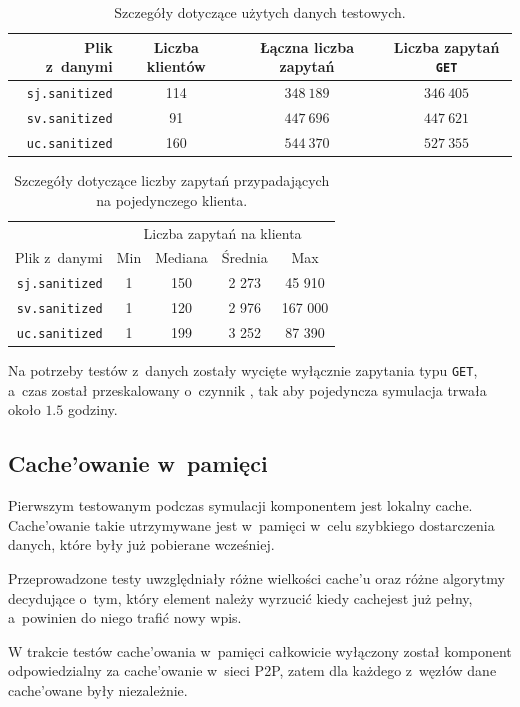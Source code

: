 \documentclass[a4paper,11pt]{scrartcl}
\newcommand{\f}{\texttt}
\newcommand{\s}{ }
\newcommand{\kesz}{cache}
\newcommand{\keszu}{cache'u}
\newcommand{\keszowania}{cache'owania}
\newcommand{\keszowane}{cache'owane}
\newcommand{\keszowanie}{cache'owanie}
\newcommand{\Keszowanie}{Cache'owanie}
\begin{document}
\begin{table}[h!]
\centering
\begin{tabular}{r c c c}
Plik z~danymi & Liczba klientów & Łączna liczba zapytań & Liczba zapytań \f{GET}\\
\hline
\f{sj.sanitized} & 114 & $348~189$ & $346~405$\\
\f{sv.sanitized} & 91 & $447~696$ & $447~621$\\
\f{uc.sanitized} & 160 & $544~370$ & $527~355$\\
\end{tabular}
\caption{Szczegóły dotyczące użytych danych testowych.}
\label{tab_testdata}
\end{table}

\begin{table}[h!]
\centering
\begin{tabular}{r c c c c}
 & \multicolumn{4}{c}{Liczba zapytań na klienta} \\
Plik z~danymi & Min & Mediana & Średnia & Max \\
\hline
\f{sj.sanitized} & 1 & 150 & 2 273 & 45 910  \\
\f{sv.sanitized} & 1 & 120 & 2 976 & 167 000 \\
\f{uc.sanitized} & 1 & 199 & 3 252 & 87 390  \\
\end{tabular}
\caption{Szczegóły dotyczące liczby zapytań przypadających na pojedynczego klienta.}
\label{tab_testdata2}
\end{table}

Na potrzeby testów z~danych zostały wycięte wyłącznie zapytania typu \f{GET}, a~czas został przeskalowany o~czynnik , tak aby pojedyncza symulacja trwała około $1.5$ godziny.

\subsection{\Keszowanie\s w~pamięci}
\label{sect_tests_mem}
Pierwszym testowanym podczas symulacji komponentem jest lokalny \kesz. \Keszowanie\s takie utrzymywane jest w~pamięci w~celu szybkiego dostarczenia danych, które były już pobierane wcześniej.

Przeprowadzone testy uwzględniały różne wielkości \keszu\s oraz różne algorytmy decydujące o~tym, który element należy wyrzucić kiedy \kesz jest już pełny, a~powinien do niego trafić nowy wpis.

W trakcie testów \keszowania\s w~pamięci całkowicie wyłączony został komponent odpowiedzialny za \keszowanie\s w~sieci P2P, zatem dla każdego z~węzłów dane \keszowane\s były niezależnie.
\end{document}
